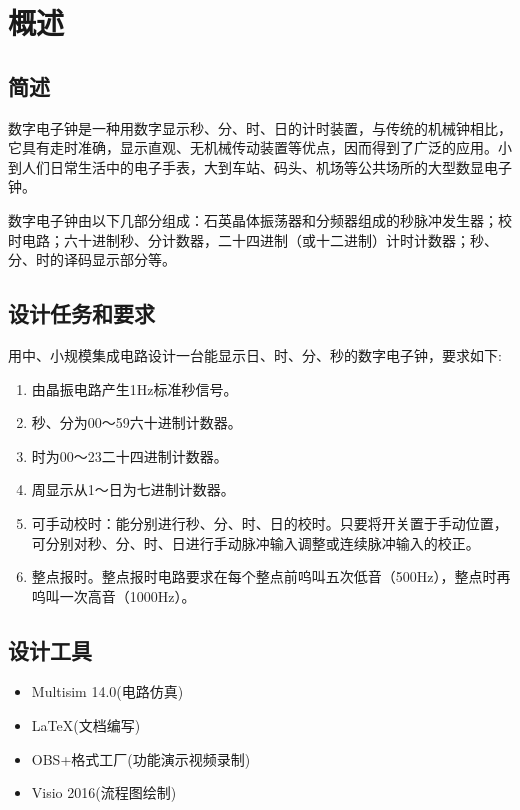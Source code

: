 \section{概述}

\subsection{简述}

数字电子钟是一种用数字显示秒、分、时、日的计时装置，与传统的机械钟相比，它具有走时准确，显示直观、无机械传动装置等优点，因而得到了广泛的应用。小到人们日常生活中的电子手表，大到车站、码头、机场等公共场所的大型数显电子钟。

数字电子钟由以下几部分组成：石英晶体振荡器和分频器组成的秒脉冲发生器；校时电路；六十进制秒、分计数器，二十四进制（或十二进制）计时计数器；秒、分、时的译码显示部分等。


\subsection{设计任务和要求}

用中、小规模集成电路设计一台能显示日、时、分、秒的数字电子钟，要求如下:

\begin{enumerate}[1.]
\item 由晶振电路产生1Hz标准秒信号。
\item 秒、分为00～59六十进制计数器。
\item 时为00～23二十四进制计数器。
\item 周显示从1～日为七进制计数器。
\item 可手动校时：能分别进行秒、分、时、日的校时。只要将开关置于手动位置，可分别对秒、分、时、日进行手动脉冲输入调整或连续脉冲输入的校正。
\item 整点报时。整点报时电路要求在每个整点前呜叫五次低音（500Hz），整点时再呜叫一次高音（1000Hz）。
\end{enumerate}

\subsection{设计工具}

\begin{itemize}
	\item Multisim 14.0(电路仿真)
	\item LaTeX(文档编写)
	\item OBS+格式工厂(功能演示视频录制)
	\item Visio 2016(流程图绘制)
\end{itemize}

